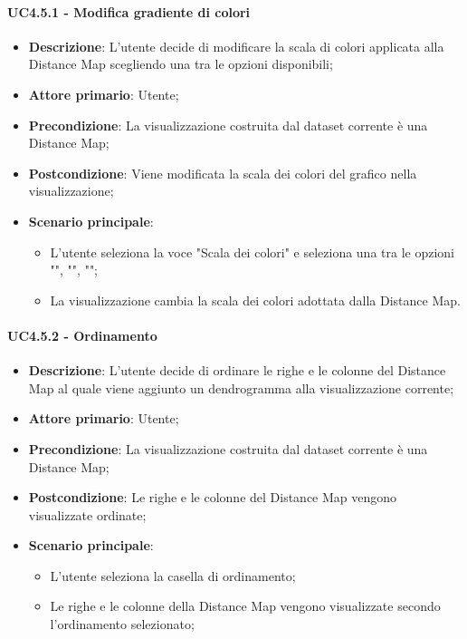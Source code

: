 \paragraph{UC4.5.1 - Modifica gradiente di colori}
\label{par:uc4.5.1}
\begin{itemize}
    \item \textbf{Descrizione}: L'utente decide di modificare la scala di colori applicata alla Distance Map scegliendo una tra le opzioni disponibili;
    \item \textbf{Attore primario}: Utente;
    \item \textbf{Precondizione}: La visualizzazione costruita dal dataset corrente è una Distance Map;
    \item \textbf{Postcondizione}: Viene modificata la scala dei colori del grafico nella visualizzazione;
    \item \textbf{Scenario principale}:
    \begin{itemize}
        \item L'utente seleziona la voce "Scala dei colori" e seleziona una tra le opzioni  "", "", "";
        \item La visualizzazione cambia la scala dei colori adottata dalla Distance Map.
    \end{itemize}
\end{itemize}

\paragraph{UC4.5.2 - Ordinamento}
\label{par:uc4.5.2}
\begin{itemize}
    \item \textbf{Descrizione}: L'utente decide di ordinare le righe e le colonne del Distance Map al quale viene aggiunto un dendrogramma alla visualizzazione corrente;
    \item \textbf{Attore primario}: Utente;
    \item \textbf{Precondizione}: La visualizzazione costruita dal dataset corrente è una Distance Map;
    \item \textbf{Postcondizione}: Le righe e le colonne del Distance Map vengono visualizzate ordinate;
    \item \textbf{Scenario principale}:
    \begin{itemize}
        \item L'utente seleziona la casella di ordinamento;
        \item Le righe e le colonne della Distance Map vengono visualizzate secondo l'ordinamento selezionato;
    \end{itemize}
\end{itemize}

